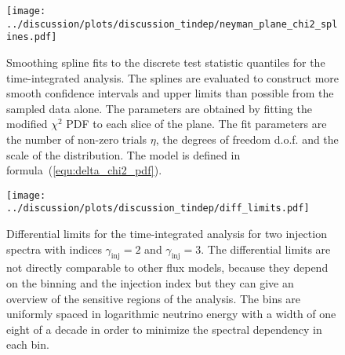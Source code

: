 \begin{figure}[H]
  \centering
  \texttt{[image: ../discussion/plots/discussion\_tindep/neyman\_plane\_chi2\_splines.pdf]}
  \caption[Splines for Neyman interval construction in the time-integrated analysis]{
    Smoothing spline fits to the discrete test statistic quantiles for the time-integrated analysis.
    The splines are evaluated to construct more smooth confidence intervals and upper limits than possible from the sampled data alone.
    The parameters are obtained by fitting the modified $\chi^2$ PDF to each slice of the plane.
    The fit parameters are the number of non-zero trials $\eta$, the degrees of freedom d.o.f. and the scale of the distribution.
    The model is defined in formula~(\ref{equ:delta_chi2_pdf}).
  }
  \label{fig:tindep_neyman_plane_chi2_splines}
\end{figure}
\enlargethispage*{5cm}
\begin{figure}[H]
  \centering
  \texttt{[image: ../discussion/plots/discussion\_tindep/diff\_limits.pdf]}
  \caption[Time-integrated analysis differential upper limits]{
    Differential limits for the time-integrated analysis for two injection spectra with indices $\gamma_\text{inj}=2$ and $\gamma_\text{inj}=3$.
    The differential limits are not directly comparable to other flux models, because they depend on the binning and the injection index but they can give an overview of the sensitive regions of the analysis.
    The bins are uniformly spaced in logarithmic neutrino energy with a width of one eight of a decade in order to minimize the spectral dependency in each bin.
  }
  \label{fig:tdep_diff_limits}
\end{figure}


